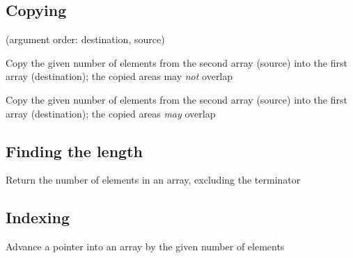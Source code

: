 \subsection{Copying}
(argument order: destination, source)\par
\begin{haddockdesc}
\item[\begin{tabular}{@{}l}
copyArray :: Storable a => Ptr a -> Ptr a -> Int -> IO ()
\end{tabular}]
{\haddockbegindoc
Copy the given number of elements from the second array (source) into the
 first array (destination); the copied areas may \emph{not} overlap\par}
\end{haddockdesc}
\begin{haddockdesc}
\item[\begin{tabular}{@{}l}
moveArray :: Storable a => Ptr a -> Ptr a -> Int -> IO ()
\end{tabular}]
{\haddockbegindoc
Copy the given number of elements from the second array (source) into the
 first array (destination); the copied areas \emph{may} overlap\par}
\end{haddockdesc}
\subsection{Finding the length}
\begin{haddockdesc}
\item[\begin{tabular}{@{}l}
lengthArray0 :: (Storable a, Eq a) => a -> Ptr a -> IO Int
\end{tabular}]
{\haddockbegindoc
Return the number of elements in an array, excluding the terminator\par}
\end{haddockdesc}
\subsection{Indexing}
\begin{haddockdesc}
\item[\begin{tabular}{@{}l}
advancePtr :: Storable a => Ptr a -> Int -> Ptr a
\end{tabular}]
{\haddockbegindoc
Advance a pointer into an array by the given number of elements\par}
\end{haddockdesc}